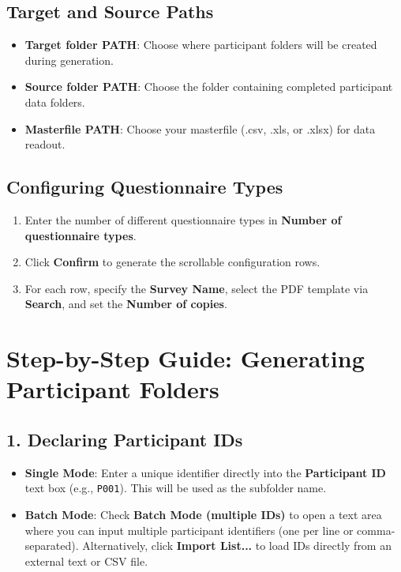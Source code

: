 \documentclass[11pt,a4paper]{article}
\begin{document}
\subsection{Target and Source Paths}
\begin{itemize}
    \item \textbf{Target folder PATH}: Choose where participant folders will be created during generation.
    \item \textbf{Source folder PATH}: Choose the folder containing completed participant data folders.
    \item \textbf{Masterfile PATH}: Choose your masterfile (.csv, .xls, or .xlsx) for data readout.
\end{itemize}

\subsection{Configuring Questionnaire Types}
\begin{enumerate}
    \item Enter the number of different questionnaire types in \textbf{Number of questionnaire types}.
    \item Click \textbf{Confirm} to generate the scrollable configuration rows.
    \item For each row, specify the \textbf{Survey Name}, select the PDF template via \textbf{Search}, and set the \textbf{Number of copies}.
\end{enumerate}

\section{Step-by-Step Guide: Generating Participant Folders}

\subsection{1. Declaring Participant IDs}
\begin{itemize}
    \item \textbf{Single Mode}: Enter a unique identifier directly into the \textbf{Participant ID} text box (e.g., \texttt{P001}). This will be used as the subfolder name.
    \item \textbf{Batch Mode}: Check \textbf{Batch Mode (multiple IDs)} to open a text area where you can input multiple participant identifiers (one per line or comma-separated). Alternatively, click \textbf{Import List...} to load IDs directly from an external text or CSV file.
\end{itemize}
\end{document}
